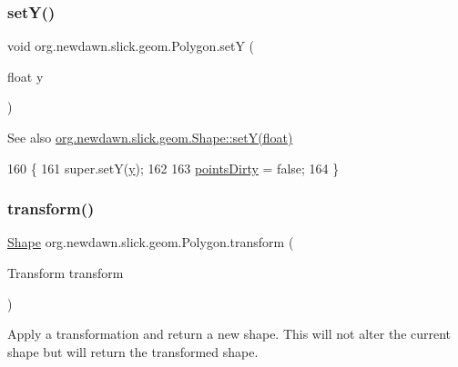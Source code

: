 \subsubsection{\texorpdfstring{set\+Y()}{setY()}}
{\footnotesize\ttfamily void org.\+newdawn.\+slick.\+geom.\+Polygon.\+setY (\begin{DoxyParamCaption}\item[{float}]{y }\end{DoxyParamCaption})\hspace{0.3cm}{\ttfamily [inline]}}

\begin{DoxySeeAlso}{See also}
\mbox{\hyperlink{classorg_1_1newdawn_1_1slick_1_1geom_1_1_shape_a7a127d0dea9bd7f0e3ce3fd0a61268fc}{org.\+newdawn.\+slick.\+geom.\+Shape\+::set\+Y(float)}} 
\end{DoxySeeAlso}

\begin{DoxyCode}
160                               \{
161         super.setY(\mbox{\hyperlink{classorg_1_1newdawn_1_1slick_1_1geom_1_1_shape_a9f934baded6a1b65ebb69e7e5f80ea00}{y}});
162         
163         \mbox{\hyperlink{classorg_1_1newdawn_1_1slick_1_1geom_1_1_shape_a61fe1954d2fdefc72c34b284f4fcfdb4}{pointsDirty}} = \textcolor{keyword}{false};
164     \}
\end{DoxyCode}
\mbox{\label{classorg_1_1newdawn_1_1slick_1_1geom_1_1_polygon_ae03273cea4a8bb9f5be71af4bc1c0c8a}} 
\subsubsection{\texorpdfstring{transform()}{transform()}}
{\footnotesize\ttfamily \mbox{\hyperlink{classorg_1_1newdawn_1_1slick_1_1geom_1_1_shape}{Shape}} org.\+newdawn.\+slick.\+geom.\+Polygon.\+transform (\begin{DoxyParamCaption}\item[{Transform}]{transform }\end{DoxyParamCaption})\hspace{0.3cm}{\ttfamily [inline]}}

Apply a transformation and return a new shape. This will not alter the current shape but will return the transformed shape.


